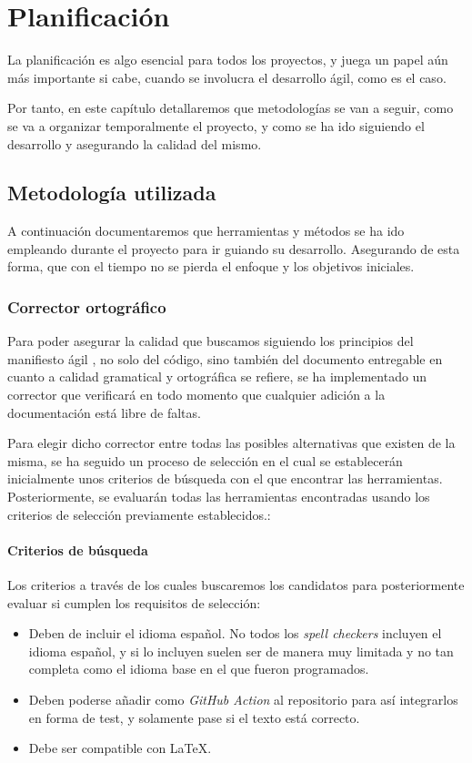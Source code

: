 \chapter{Planificación}

La planificación es algo esencial para todos los proyectos, y juega un papel aún 
más importante si cabe, cuando se involucra el desarrollo ágil, como es el caso. 

Por tanto, en este capítulo detallaremos que metodologías se van a seguir, como 
se va a organizar temporalmente el proyecto, y como se ha ido siguiendo el 
desarrollo y asegurando la calidad del mismo. 

\section{Metodología utilizada}

A continuación documentaremos que herramientas y métodos se ha ido empleando 
durante el proyecto para ir guiando su desarrollo. Asegurando de esta forma, que 
con el tiempo no se pierda el enfoque y los objetivos iniciales. 

\subsection{Corrector ortográfico}
Para poder asegurar la calidad que buscamos siguiendo los principios del manifiesto
ágil \cite{agile-manifiesto}, no solo del código, sino también del documento
entregable en cuanto a calidad gramatical y ortográfica se refiere, se ha
implementado un corrector que verificará en todo momento que cualquier adición a
la documentación está libre de faltas. 

Para elegir dicho corrector entre todas las posibles alternativas que existen de 
la misma, se ha seguido un proceso de selección en el cual se establecerán 
inicialmente unos criterios de búsqueda con el que encontrar las herramientas. 
Posteriormente, se evaluarán todas las herramientas encontradas usando los 
criterios de selección previamente establecidos.: 

\subsubsection{Criterios de búsqueda}

Los criterios a través de los cuales buscaremos los candidatos para
posteriormente evaluar si cumplen los requisitos de selección:
\begin{itemize}
    \item Deben de incluir el idioma español. No todos los \emph{spell checkers}
    incluyen el idioma español, y si lo incluyen suelen ser de manera muy
    limitada y no tan completa como el idioma base en el que fueron programados.
    \item Deben poderse añadir como \emph{GitHub Action} al repositorio para así
    integrarlos en forma de test, y solamente pase si el texto está correcto.
    \item Debe ser compatible con LaTeX.
\end{itemize}

